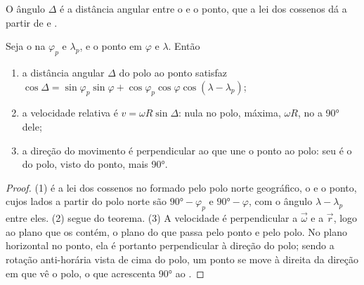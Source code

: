 O ângulo $\Delta$ é a distância angular entre o  e o ponto,
que a lei dos cossenos dá a partir de  e .

\begin{proposition}\label{prop:b1:plate-kinematics:speed}
Seja o  na  $\varphi_p$ e  $\lambda_p$, e o ponto em $\varphi$ e $\lambda$. Então
\begin{enumerate}
  \item a distância angular $\Delta$ do polo ao ponto satisfaz
        $\cos\Delta = \sin\varphi_p\sin\varphi + \cos\varphi_p\cos\varphi
        \cos(\lambda - \lambda_p)$;
  \item a velocidade relativa é $v = \omega R\sin\Delta$: nula no polo,
        máxima, $\omega R$, no  a \ang{90} dele;
  \item a direção do movimento é perpendicular ao  que une o
        ponto ao polo: seu  é o do polo, visto do ponto,
        mais \ang{90}.
\end{enumerate}
\end{proposition}

\begin{proof}
(1) é a lei dos cossenos no  formado pelo polo norte geográfico, o  e o ponto, cujos lados a partir do polo norte são
$\ang{90} - \varphi_p$ e $\ang{90} - \varphi$, com o ângulo
$\lambda - \lambda_p$ entre eles. (2) segue do teorema. (3) A
velocidade é perpendicular a $\vec\omega$ e a $\vec r$, logo ao plano que os contém, o plano do  que passa pelo ponto e pelo polo. No
plano horizontal no ponto, ela é portanto perpendicular à direção do polo; sendo a rotação anti-horária vista de cima do
polo, um ponto se move à direita da direção em que vê o polo, o que acrescenta \ang{90} ao .
\end{proof}

